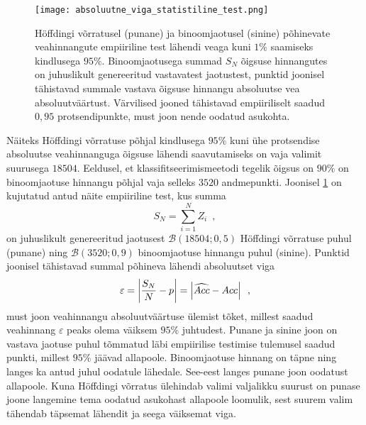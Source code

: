 \begin{figure}[H]
    \begin{center}
        \texttt{[image: absoluutne\_viga\_statistiline\_test.png]} 
    \end{center}
    \caption{Höffdingi võrratusel (punane) ja binoomjaotusel (sinine) põhinevate veahinnangute empiiriline test lähendi veaga kuni $1\%$ saamiseks kindlusega $95\%$. Binoomjaotusega summad $S_N$ õigsuse hinnangutes on juhuslikult genereeritud vastavatest jaotustest, punktid joonisel tähistavad summale vastava õigsuse hinnangu absoluutse vea absoluutväärtust. Värvilised jooned tähistavad empiiriliselt saadud $0{,}95$ protsendipunkte, must joon nende oodatud asukohta.}
    \label{fig:höffding ja binoomjaotus absoluutne viga empiiriline test}
\end{figure}

Näiteks Höffdingi võrratuse põhjal kindlusega $95\%$ kuni ühe protsendise absoluutse veahinnanguga õigsuse lähendi saavutamiseks on vaja valimit suurusega $18504$. Eeldusel, et klassifitseerimismeetodi tegelik õigsus on $90\%$ on binoomjaotuse hinnangu põhjal vaja selleks $3520$ andmepunkti. Joonisel \ref{fig:höffding ja binoomjaotus absoluutne viga empiiriline test} on kujutatud antud näite empiiriline test, kus summa
\begin{equation*}
    S_N=\sum_{i=1}^N Z_i \enspace,
\end{equation*}
on juhuslikult genereeritud jaotusest $\mathcal{B}(18504; 0{,}5)$ Höffdingi võrratuse puhul (punane) ning $\mathcal{B}(3520; 0{,}9)$ binoomjaotuse hinnangu puhul (sinine). Punktid joonisel tähistavad summal põhineva lähendi absoluutset viga
\begin{equation*}
    \varepsilon=\left|\frac{S_N}{N}-p\right|=\left|\widehat{Acc}-Acc\right| \enspace,
\end{equation*}
must joon veahinnangu absoluutväärtuse ülemist tõket, millest saadud veahinnang $\varepsilon$ peaks olema väiksem $95\%$ juhtudest. Punane ja sinine joon on vastava jaotuse puhul tõmmatud läbi empiirilise testimise tulemusel saadud punkti, millest $95\%$ jäävad allapoole. Binoomjaotuse hinnang on täpne ning langes ka antud juhul oodatule lähedale. See-eest langes punane joon oodatust allapoole. Kuna Höffdingi võrratus ülehindab valimi valjalikku suurust on punase joone langemine tema oodatud asukohast allapoole loomulik, sest suurem valim tähendab täpsemat lähendit ja seega väiksemat viga.

